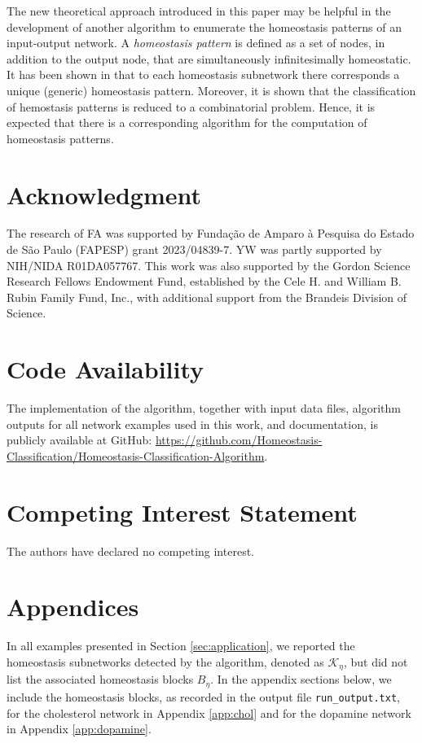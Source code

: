 \documentclass[pdflatex,sn-basic,Numbered]{sn-jnl}
\newcommand{\KK}{{\mathcal K}}
\theoremstyle{thmstyleone}%
\numberwithin{equation}{section}
\begin{document}
The new theoretical approach introduced in this paper may be helpful in the development of another algorithm to enumerate the homeostasis patterns of an input-output network.
A \emph{homeostasis pattern} is defined as a set of nodes, in addition to the output node, that are simultaneously infinitesimally homeostatic.
It has been shown in \cite{duncan2024homeostasis,antoneli2025b} that to each homeostasis subnetwork there corresponds a unique (generic) homeostasis pattern.
Moreover, it is shown that the classification of hemostasis patterns is reduced to a combinatorial problem.
Hence, it is expected that there is a corresponding algorithm for the computation of homeostasis patterns.


\section*{Acknowledgment}

The research of FA was supported by Funda\c{c}\~ao de Amparo \`a Pes\-qui\-sa do Estado de S\~ao Paulo (FAPESP) grant 2023/04839-7.  YW was partly supported by NIH/NIDA R01DA057767. This work was also supported by the Gordon Science Research Fellows Endowment Fund, established by the Cele H. and William B. Rubin Family Fund, Inc., with additional support from the Brandeis Division of Science. 

\section*{Code Availability}

The implementation of the algorithm, together with input data files, algorithm outputs for all network examples used in this work, and documentation, is publicly available at GitHub: \url{https://github.com/Homeostasis-Classification/Homeostasis-Classification-Algorithm}. 

\section*{Competing Interest Statement}

The authors have declared no competing interest. 

\section*{Appendices}

In all examples presented in Section \ref{sec:application}, we reported the homeostasis subnetworks detected by the algorithm, denoted as $\KK_\eta$, but did not list the associated homeostasis blocks $B_\eta$. In the appendix sections below, we include the homeostasis blocks, as recorded in the output file \texttt{run\_output.txt}, for the cholesterol network in Appendix \ref{app:chol} and for the dopamine network in Appendix \ref{app:dopamine}. 
\end{document}
